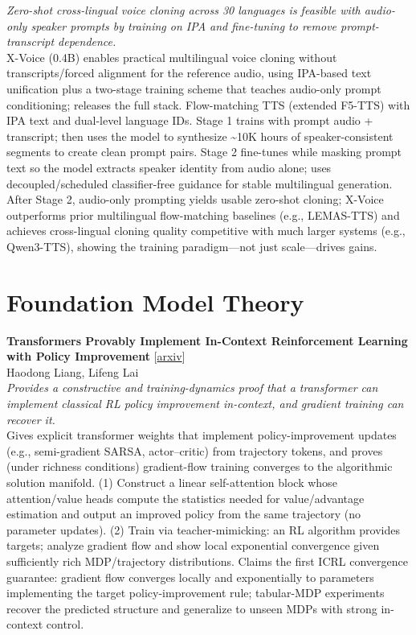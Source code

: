 \documentclass[12pt,letterpaper]{article}
\begin{document}
{\small\textit{Zero-shot cross-lingual voice cloning across 30 languages is feasible with audio-only speaker prompts by training on IPA and fine-tuning to remove prompt-transcript dependence.}}\\[1pt]
{\footnotesize X-Voice (0.4B) enables practical multilingual voice cloning without transcripts/forced alignment for the reference audio, using IPA-based text unification plus a two-stage training scheme that teaches audio-only prompt conditioning; releases the full stack. Flow-matching TTS (extended F5-TTS) with IPA text and dual-level language IDs. Stage 1 trains with prompt audio + transcript; then uses the model to synthesize \textasciitilde{}10K hours of speaker-consistent segments to create clean prompt pairs. Stage 2 fine-tunes while masking prompt text so the model extracts speaker identity from audio alone; uses decoupled/scheduled classifier-free guidance for stable multilingual generation. After Stage 2, audio-only prompting yields usable zero-shot cloning; X-Voice outperforms prior multilingual flow-matching baselines (e.g., LEMAS-TTS) and achieves cross-lingual cloning quality competitive with much larger systems (e.g., Qwen3-TTS), showing the training paradigm---not just scale---drives gains.}

\medskip


\section*{Foundation Model Theory}

{\small\textbf{Transformers Provably Implement In-Context Reinforcement Learning with Policy Improvement}} {\scriptsize[\href{https://arxiv.org/abs/2605.05755}{arxiv}]}\\
{\scriptsize Haodong Liang, Lifeng Lai}\\

{\small\textit{Provides a constructive and training-dynamics proof that a transformer can implement classical RL policy improvement in-context, and gradient training can recover it.}}\\[1pt]
{\footnotesize Gives explicit transformer weights that implement policy-improvement updates (e.g., semi-gradient SARSA, actor--critic) from trajectory tokens, and proves (under richness conditions) gradient-flow training converges to the algorithmic solution manifold. (1) Construct a linear self-attention block whose attention/value heads compute the statistics needed for value/advantage estimation and output an improved policy from the same trajectory (no parameter updates). (2) Train via teacher-mimicking: an RL algorithm provides targets; analyze gradient flow and show local exponential convergence given sufficiently rich MDP/trajectory distributions. Claims the first ICRL convergence guarantee: gradient flow converges locally and exponentially to parameters implementing the target policy-improvement rule; tabular-MDP experiments recover the predicted structure and generalize to unseen MDPs with strong in-context control.}
\end{document}
